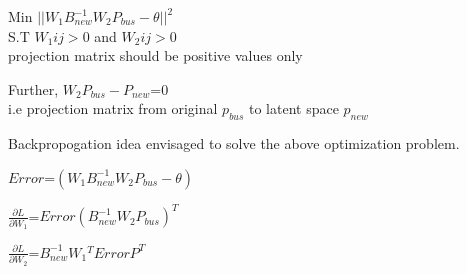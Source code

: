 \documentclass[12pt]{article}
\begin{document}
\begin{center}


Min $||W_1B_{new}^{-1}W_2P_{bus}-\theta||^2$\\

S.T $W_1ij>0$ and $W_2ij>0$ \\
 projection matrix should be positive values only

Further, $W_2P_{bus}-P_{new}$=$0$ \\
i.e  projection matrix from original $p_{bus} $ to latent space $p_{new}$\\




\end{center}

Backpropogation idea envisaged to solve the above optimization problem.

\begin{center}
$Error$=$(W_1B_{new}^{-1}W_2P_{bus}-\theta)$

$\frac{\partial L}{\partial W_1}$=$Error(B_{new}^{-1}W_2P_{bus})^T$


$\frac{\partial L}{\partial W_2}$=$B_{new}^{-1}W_1{^T}ErrorP^T$
\end{center}
\end{document}
